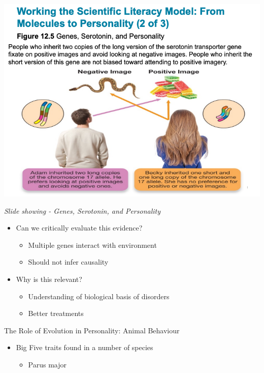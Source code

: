 \documentclass[
]{book}
\providecommand{\tightlist}{%
  \setlength{\itemsep}{0pt}\setlength{\parskip}{0pt}}
\begin{document}
\begin{reflect}
\includegraphics{assets/unit_5/slide_22.png}

\emph{Slide showing - Genes, Serotonin, and Personality}

\begin{itemize}
\tightlist
\item
  Can we critically evaluate this evidence?

  \begin{itemize}
  \tightlist
  \item
    Multiple genes interact with environment\\
  \item
    Should not infer causality\\
  \end{itemize}
\item
  Why is this relevant?

  \begin{itemize}
  \tightlist
  \item
    Understanding of biological basis of disorders\\
  \item
    Better treatments
  \end{itemize}
\end{itemize}

The Role of Evolution in Personality: Animal Behaviour

\begin{itemize}
\tightlist
\item
  Big Five traits found in a number of species

  \begin{itemize}
  \tightlist
  \item
    Parus major


\end{itemize}
\end{itemize}
\end{reflect}
\end{document}
